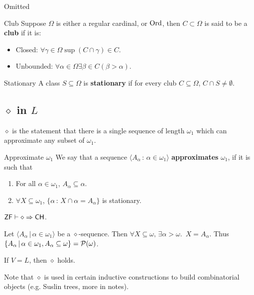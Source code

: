 \documentclass{article}
\begin{document}
\proof Omitted \endproof
\begin{fancydefine}{Club}
    Suppose $\Omega$ is either a regular cardinal, or $\operatorname{Ord}$, then $C \subset \Omega$ is said to be a \textbf{club} if it is: \begin{itemize}
        \item Closed: $\forall \gamma \in \Omega \sup(C \cap \gamma) \in C$.
        \item Unbounded: $\forall \alpha \in \Omega \exists \beta \in C (\beta > \alpha)$.
    \end{itemize}
\end{fancydefine}
\begin{fancydefine}{Stationary}
    A class $S \subseteq \Omega$ is \textbf{stationary} if for every club $C \subseteq \Omega$, $C \cap S \neq \emptyset$.
\end{fancydefine}
\subsection{$\diamond$ in $L$}
$\diamond$ is the statement that there is a single sequence of length $\omega_{1}$ which can approximate any subset of $\omega_{1}$.
\begin{fancydefine}{Approximate $\omega_{1}$}
    We say that a sequence $ \langle A_{\alpha} \, : \, \alpha \in \omega_{1}\rangle$ \textbf{approximates }$\omega_{1}$, if it is such that \begin{enumerate}
        \item[(i)] For all $\alpha \in \omega_{1}$, $A_{\alpha} \subseteq \alpha$.
        \item[(ii)] $\forall X \subseteq \omega_{1}$, $\{ \alpha \, : \, X \cap \alpha = A_{\alpha}\}$ is stationary.
    \end{enumerate}
\end{fancydefine}
\begin{fancylem}{}
    $\mathsf{ZF} \vdash \diamond \Rightarrow \mathsf{CH}$.
\end{fancylem}
\proof Let $\langle A_{\alpha} \, | \, \alpha \in \omega_{1}\rangle$ be a $\diamond$-sequence. Then $\forall X \subseteq \omega,\, \exists \alpha > \omega. \,\,\, X = A_{\alpha}$. Thus $\{A_{\alpha} \, | \, \alpha \in \omega_{1}, A_{\alpha} \subseteq \omega\} = \mathcal{P}(\omega)$. \endproof
\begin{fancythm}
    If $V=L$, then $\diamond$ holds.
\end{fancythm}
Note that $\diamond$ is used in certain inductive constructions to build combinatorial objects (e.g. Suslin trees, more in notes).
\end{document}
